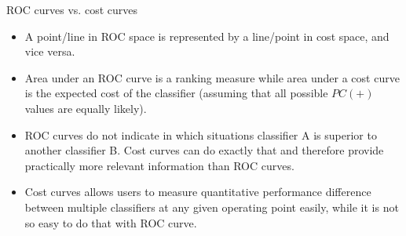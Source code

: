 
\begin{vbframe}{ROC curves vs. cost curves}

\begin{itemize}
  \item A point/line in ROC space is represented by a line/point in cost space, and vice versa.
  \item Area under an ROC curve is a ranking measure while area under a cost curve is the expected cost of the classifier (assuming that all possible $PC(+)$ values are equally likely).
  \item ROC curves do not indicate in which situations classifier A is superior to another classifier B. Cost curves can do exactly that and therefore provide practically more relevant information than ROC curves.
  \item Cost curves allows users to measure quantitative performance difference between multiple classifiers at any given operating point easily, while it is not so easy to do that with ROC curve.
  \end{itemize}

\end{vbframe}


%
%
%
%

\endlecture


